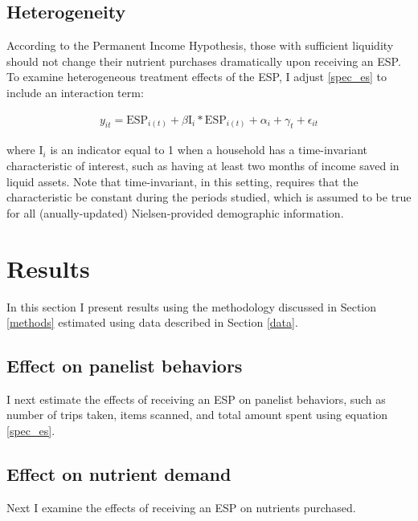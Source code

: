 \documentclass[12pt]{article}
\begin{document}
\subsection{Heterogeneity}

According to the Permanent Income Hypothesis, those with sufficient liquidity should not change their nutrient purchases dramatically upon receiving an ESP. To examine heterogeneous treatment effects of the ESP, I adjust \ref{spec_es} to include an interaction term:

\begin{align}
	y_{it} = \text{ESP}_{i(t)} + \beta \text{I}_{i} * \text{ESP}_{i(t)} + \alpha_i + \gamma_t + \epsilon_{it} \label{spec_het}
\end{align}

where $\text{I}_{i}$ is an indicator equal to 1 when a household has a time-invariant characteristic of interest, such as having at least two months of income saved in liquid assets. Note that time-invariant, in this setting, requires that the characteristic be constant during the periods studied, which is assumed to be true for all (anually-updated) Nielsen-provided demographic information.


\section{Results} \label{results}

In this section I present results using the methodology discussed in Section \ref{methods} estimated using data described in Section \ref{data}.

\subsection{Effect on panelist behaviors}

I next estimate the effects of receiving an ESP on panelist behaviors, such as number of trips taken, items scanned, and total amount spent using equation \ref{spec_es}.



\subsection{Effect on nutrient demand}

Next I examine the effects of receiving an ESP on nutrients purchased.
\end{document}
